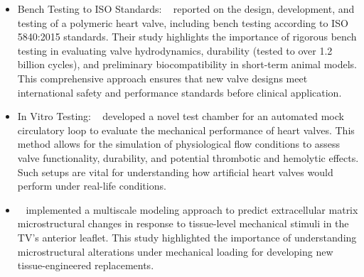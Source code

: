 \begin{itemize}
    \item Bench Testing to ISO Standards: ~ reported on the design, development, and testing of a polymeric heart valve, including bench testing according to ISO 5840:2015 standards. Their study highlights the importance of rigorous bench testing in evaluating valve hydrodynamics, durability (tested to over 1.2 billion cycles), and preliminary biocompatibility in short-term animal models. This comprehensive approach ensures that new valve designs meet international safety and performance standards before clinical application.
    \item In Vitro Testing: ~ developed a novel test chamber for an automated mock circulatory loop to evaluate the mechanical performance of heart valves. This method allows for the simulation of physiological flow conditions to assess valve functionality, durability, and potential thrombotic and hemolytic effects. Such setups are vital for understanding how artificial heart valves would perform under real-life conditions.
    \item ~ implemented a multiscale modeling approach to predict extracellular matrix microstructural changes in response to tissue-level mechanical stimuli in the \gls{TV}'s anterior leaflet. This study highlighted the importance of understanding microstructural alterations under mechanical loading for developing new tissue-engineered replacements.
\end{itemize}

